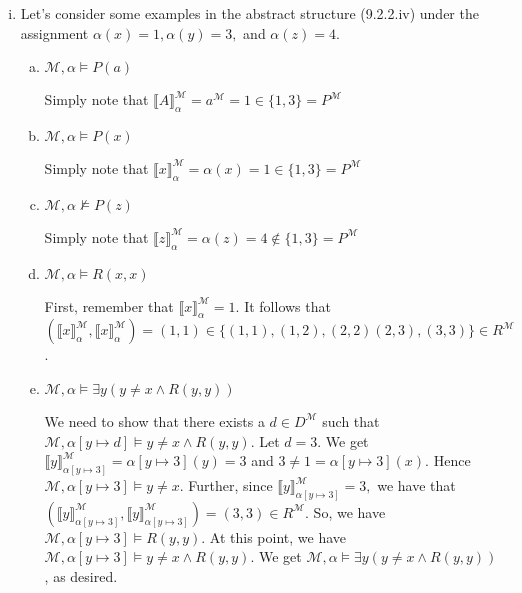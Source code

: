 \begin{enumerate}[\thesection.1]
\begin{enumerate}[(i)]
\begin{enumerate}[(a)]
			\end{enumerate}
			
			\item Let's consider some examples in the abstract structure (9.2.2.iv) under the assignment $\alpha(x)=1, \alpha(y)=3, $ and $\alpha(z)=4$.
			
			\begin{enumerate}[(a)]
			
			\item $\mathcal{M},\alpha\vDash P(a)$
				
				Simply note that $\llbracket A\rrbracket^\mathcal{M}_\alpha=a^\mathcal{M}=1\in \{1,3\}=P^\mathcal{M}$		
					
				\item $\mathcal{M},\alpha\vDash P(x)$
				
				Simply note that $\llbracket x\rrbracket^\mathcal{M}_\alpha=\alpha(x)=1\in \{1,3\}=P^\mathcal{M}$
				
				\item $\mathcal{M},\alpha\nvDash P(z)$
				
				Simply note that $\llbracket z\rrbracket^\mathcal{M}_\alpha=\alpha(z)=4\notin \{1,3\}=P^\mathcal{M}$
				
				
				\item $\mathcal{M},\alpha\vDash R(x,x)$
				
				First,  remember that $\llbracket x\rrbracket^\mathcal{M}_\alpha=1.$ It follows that $(\llbracket x\rrbracket^\mathcal{M}_\alpha,\llbracket x\rrbracket^\mathcal{M}_\alpha)=(1,1)\in\{(1,1), (1,2),(2,2) (2,3), (3,3)\}\in R^\mathcal{M}$.
				
				\item $\mathcal{M},\alpha\vDash \exists y (y\neq x\land R(y,y))$
				
				We need to show that there exists a $d\in D^\mathcal{M}$ such that $\mathcal{M},\alpha[y\mapsto d]\vDash y\neq x\land R(y,y)$. Let $d=3$. We get $\llbracket y\rrbracket^\mathcal{M}_{\alpha[y\mapsto 3]}=\alpha[y\mapsto 3](y)=3$  and $3\neq 1=\alpha[y\mapsto 3](x)$. Hence $\mathcal{M},\alpha[y\mapsto 3]\vDash y\neq x$. Further, since $\llbracket y\rrbracket^\mathcal{M}_{\alpha[y\mapsto 3]}=3,$ we have that $(\llbracket y\rrbracket^\mathcal{M}_{\alpha[y\mapsto 3]},\llbracket y\rrbracket^\mathcal{M}_{\alpha[y\mapsto 3]})=(3,3)\in R^\mathcal{M}$. So, we have $\mathcal{M},\alpha[y\mapsto 3]\vDash R(y,y)$. At this point, we have $\mathcal{M},\alpha[y\mapsto 3]\vDash y\neq x\land R(y,y)$. We get $\mathcal{M},\alpha\vDash \exists y (y\neq x\land R(y,y))$, as desired.
				

\end{enumerate}
\end{enumerate}
\end{enumerate}
